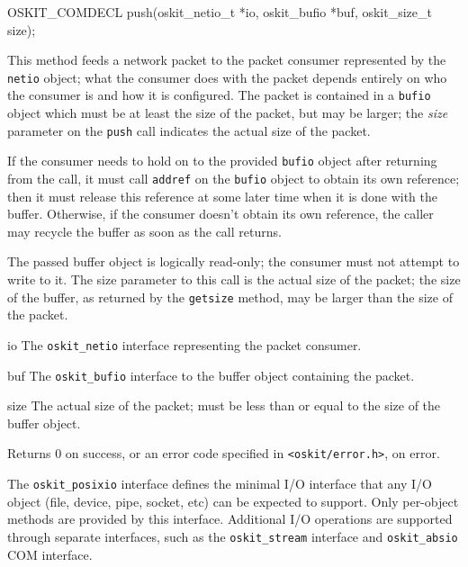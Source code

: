 \begin{apisyn}

	\funcproto OSKIT_COMDECL
	push(oskit_netio_t *io, oskit_bufio *buf, oskit_size_t size);
\end{apisyn}
\begin{apidesc}
	This method feeds a network packet
	to the packet consumer represented by the \texttt{netio} object;
	what the consumer does with the packet
	depends entirely on who the consumer is and how it is configured.
	The packet is contained in a \texttt{bufio} object
	which must be at least the size of the packet,
	but may be larger;
	the \emph{size} parameter on the \texttt{push} call
	indicates the actual size of the packet.

	If the consumer needs to hold on to the provided \texttt{bufio} object
	after returning from the call,
	it must call \texttt{addref} on the \texttt{bufio} object
	to obtain its own reference;
	then it must release this reference at some later time
	when it is done with the buffer.
	Otherwise, if the consumer doesn't obtain its own reference,
	the caller may recycle the buffer as soon as the call returns.

	The passed buffer object is logically read-only;
	the consumer must not attempt to write to it.
	The size parameter to this call is the actual size of the packet;
	the size of the buffer, as returned by the \texttt{getsize} method,
	may be larger than the size of the packet.
\end{apidesc}
\begin{apiparm}
	\item[io]
		The \texttt{oskit_netio} interface
		representing the packet consumer.
	\item[buf]
		The \texttt{oskit_bufio} interface
		to the buffer object containing the packet.
	\item[size]
		The actual size of the packet;
		must be less than or equal to
		the size of the buffer object.
\end{apiparm}
\begin{apiret}
	Returns 0 on success, or an error code specified in
	{\tt <oskit/error.h>}, on error.
\end{apiret}


\label{oskit-posixio}

	The {\tt oskit_posixio} interface defines the minimal \posix{} I/O
interface that any \posix{} I/O object (file, device, pipe, socket, etc)
can be expected to support.  Only per-object methods are provided by
this interface.  Additional I/O operations are supported through
separate interfaces, such as the {\tt oskit_stream} interface and
{\tt oskit_absio} COM interface.

